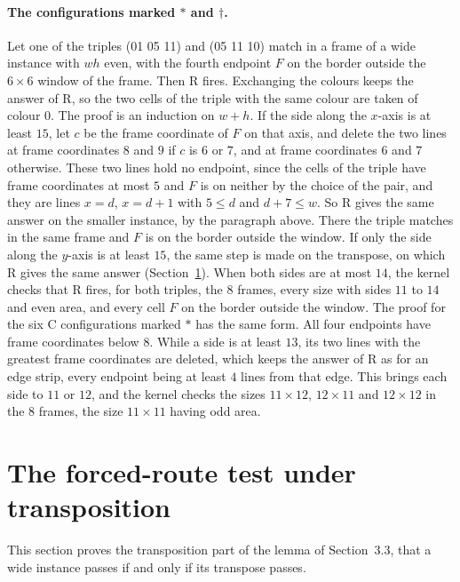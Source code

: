 \documentclass[11pt]{article}
\begin{document}
\paragraph{The configurations marked $*$ and $\dagger$.} Let one of the triples (01 05 11) and (05 11 10) match
in a frame of a wide instance with $wh$ even, with the fourth endpoint $F$ on the border outside
the $6\times 6$ window of the frame. Then R fires. Exchanging the colours keeps the answer of R,
so the two cells of the triple with the same colour are taken of colour $0$. The proof is an
induction on $w+h$. If the side
along the $x$-axis is at least $15$, let $c$ be the frame coordinate of $F$ on that axis, and
delete the two lines at frame coordinates $8$ and $9$ if $c$ is $6$ or $7$, and at frame
coordinates $6$ and $7$ otherwise. These two lines hold no endpoint, since the cells of the triple
have frame coordinates at most $5$ and $F$ is on neither by the choice of the pair, and they are lines $x=d$, $x=d+1$ with $5\le d$ and $d+7\le w$.
So R gives the same answer on the smaller instance, by the paragraph above. There the triple
matches in the same frame and $F$ is on the border outside the window. If only the side along the
$y$-axis is at least $15$, the same step is made on the transpose, on which R gives the same answer
(Section~\ref{sec:rtrans}). When both sides are at most $14$, the kernel checks that R fires, for
both triples, the $8$ frames, every size with sides $11$ to $14$ and even area, and every cell $F$
on the border outside the window. The proof for the six C configurations marked $*$ has the same
form. All four endpoints have frame coordinates below $8$. While a side is at least $13$, its two
lines with the greatest frame coordinates are deleted, which keeps the answer of R as for an edge
strip, every endpoint being at least $4$ lines from that edge. This brings each side to $11$ or
$12$, and the kernel checks the sizes $11\times 12$, $12\times 11$ and $12\times 12$ in the $8$
frames, the size $11\times 11$ having odd area.

\section{The forced-route test under transposition}\label{sec:rtrans}

This section proves the transposition part of the lemma of Section~3.3, that a wide instance
passes if and only if its transpose passes.
\end{document}
